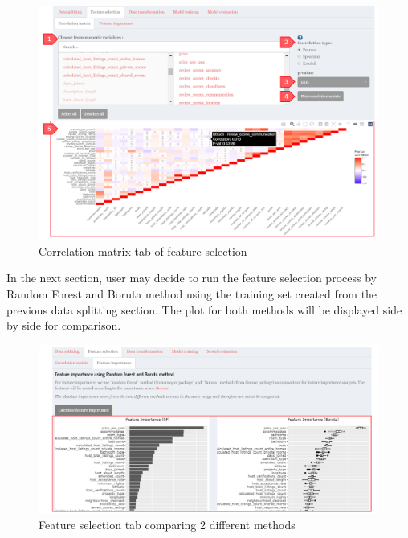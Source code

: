 \documentclass[
  12pt,
]{article}
\begin{document}
\begin{figure}[H]

{\centering \includegraphics[width=0.95\linewidth]{images/corrmatrix} 

}

\caption{Correlation matrix tab of feature selection}\label{fig:unnamed-chunk-20}
\end{figure}

In the next section, user may decide to run the feature selection
process by Random Forest and Boruta method using the training set
created from the previous data splitting section. The plot for both
methods will be displayed side by side for comparison.

\begin{figure}[H]

{\centering \includegraphics[width=0.95\linewidth]{images/featureselect} 

}

\caption{Feature selection tab comparing 2 different methods}\label{fig:unnamed-chunk-21}
\end{figure}
\end{document}
